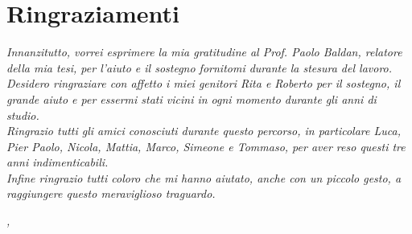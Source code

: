 
\cleardoublepage
{}
{}
\begingroup
\let\clearpage\relax
\let\cleardoublepage\relax
\let\cleardoublepage\relax

\chapter*{Ringraziamenti}

\noindent \textit{Innanzitutto, vorrei esprimere la mia gratitudine al Prof. Paolo Baldan, relatore della mia tesi, per l'aiuto e il sostegno fornitomi durante la stesura del lavoro.}\\

\noindent \textit{Desidero ringraziare con affetto i miei genitori Rita e Roberto per il sostegno, il grande aiuto e per essermi stati vicini in ogni momento durante gli anni di studio.}\\

\noindent \textit{Ringrazio tutti gli amici conosciuti durante questo percorso, in particolare Luca, Pier Paolo, Nicola, Mattia, Marco, Simeone e Tommaso, per aver reso questi tre anni indimenticabili.}\\

\noindent \textit{Infine ringrazio tutti coloro che mi hanno aiutato, anche con un piccolo gesto, a raggiungere questo meraviglioso traguardo.}\\
\bigskip

\noindent\textit{\myLocation, \myTime}
\hfill \myName

\endgroup

